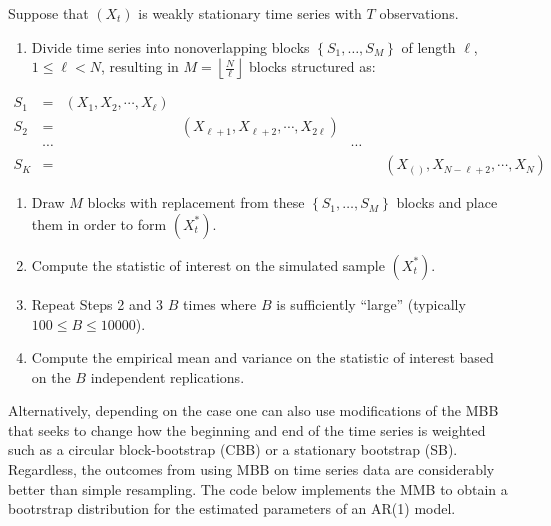 \documentclass[]{book}
\providecommand{\tightlist}{%
  \setlength{\itemsep}{0pt}\setlength{\parskip}{0pt}}
\theoremstyle{definition}
\theoremstyle{definition}
\theoremstyle{definition}
\theoremstyle{remark}
\let\BeginKnitrBlock\begin \let\EndKnitrBlock\end
\begin{document}
\BeginKnitrBlock{definition}
\protect\hypertarget{def:nbb}{}{\label{def:nbb} }Suppose that
\(\left(X_t\right)\) is weakly stationary time series with \(T\)
observations.

\begin{enumerate}
\def\labelenumi{\arabic{enumi}.}
\tightlist
\item
  Divide time series into nonoverlapping blocks
  \(\left\{S_1, \ldots, S_M\right\}\) of length \(\ell\),
  \(1 \le \ell < N\), resulting in
  \(M = \left\lfloor {\frac{N}{\ell}} \right\rfloor\) blocks structured
  as:
\end{enumerate}

\[\begin{aligned}
  {S_1}& = & ({X_1}, {X_2}, \cdots , {X_\ell})& & && \\
  {S_2}& = & &( {X_{\ell+1}}, {X_{\ell+2}}, \cdots , {X_{2\ell}}) & && \\
  & \cdots & & {} & \cdots && \\
  {S_K} & = & & & {} &&( {X_{\left({}\right)}}, {X_{N-\ell+2}}, \cdots , {X_{N}})
  \end{aligned}\]

\begin{enumerate}
\def\labelenumi{\arabic{enumi}.}
\setcounter{enumi}{1}
\tightlist
\item
  Draw \(M\) blocks with replacement from these
  \(\left\{S_1, \ldots, S_M\right\}\) blocks and place them in order to
  form \((X_t^*)\).
\item
  Compute the statistic of interest on the simulated sample \((X_t^*)\).
\item
  Repeat Steps 2 and 3 \(B\) times where \(B\) is sufficiently ``large''
  (typically \(100 \leq B \leq 10000\)).
\item
  Compute the empirical mean and variance on the statistic of interest
  based on the \(B\) independent replications.
\end{enumerate}
\EndKnitrBlock{definition}

Alternatively, depending on the case one can also use modifications of
the MBB that seeks to change how the beginning and end of the time
series is weighted such as a circular block-bootstrap (CBB) or a
stationary bootstrap (SB). Regardless, the outcomes from using MBB on
time series data are considerably better than simple resampling. The
code below implements the MMB to obtain a bootrstrap distribution for
the estimated parameters of an AR(1) model.
\end{document}
